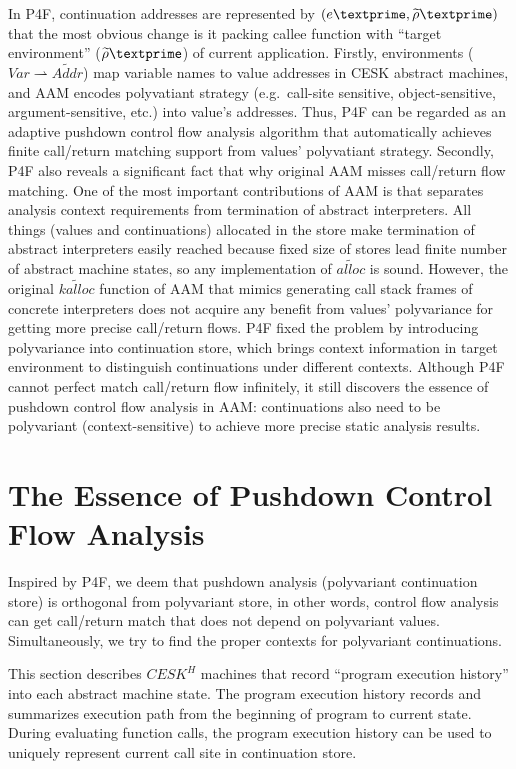 \documentclass{article}
\begin{document}
In P4F, continuation addresses are represented by $(e\textprime, \widetilde{\rho}\textprime)$ that the most obvious change is it packing callee function with ``target environment'' ($\widetilde{\rho}\textprime$) of current application.
Firstly, environments ($Var \rightharpoonup \widetilde{Addr}$) map variable names to value addresses in CESK abstract machines, and AAM encodes polyvatiant strategy (e.g.\ call-site sensitive, object-sensitive, argument-sensitive, etc.) into value's addresses.
Thus, P4F can be regarded as an adaptive pushdown control flow analysis algorithm that automatically achieves finite call/return matching support from values' polyvatiant strategy. %
Secondly, P4F also reveals a significant fact that why original AAM misses call/return flow matching.
One of the most important contributions of AAM is that separates analysis context requirements from termination of abstract interpreters.
All things (values and continuations) allocated in the store make termination of abstract interpreters easily reached because fixed size of stores lead finite number of abstract machine states, so any implementation of $\widetilde{alloc}$ is sound.
However, the original $\widetilde{kalloc}$ function of AAM that mimics generating call stack frames of concrete interpreters does not acquire any benefit from values' polyvariance for getting more precise call/return flows.
P4F fixed the problem by introducing polyvariance into continuation store, which brings context information in target environment to distinguish continuations under different contexts.
Although P4F cannot perfect match call/return flow infinitely, it still discovers the essence of pushdown control flow analysis in AAM\@: continuations also need to be polyvariant (context-sensitive) to achieve more precise static analysis results.

\section{The Essence of Pushdown Control Flow Analysis}
\label{sec:The Essence of Pushdown Control Flow Analysis}
Inspired by P4F, we deem that pushdown analysis (polyvariant continuation store) is orthogonal from polyvariant store, in other words, control flow analysis can get call/return match that does not depend on polyvariant values. Simultaneously, we try to find the proper contexts for polyvariant continuations.

This section describes $CESK^H$ machines that record ``program execution history'' into each abstract machine state.
The program execution history records and summarizes execution path from the beginning of program to current state.
During evaluating function calls, the program execution history can be used to uniquely represent current call site in continuation store.
\end{document}
